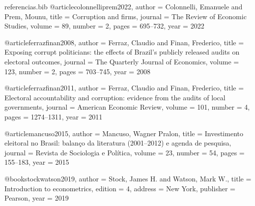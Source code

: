 \begin{filecontents*}[overwrite]{referencias.bib}
@article{colonnelliprem2022,
  author  = {Colonnelli, Emanuele and Prem, Mounu},
  title   = {Corruption and firms},
  journal = {The Review of Economic Studies},
  volume  = {89},
  number  = {2},
  pages   = {695--732},
  year    = {2022}
}

@article{ferrazfinan2008,
  author  = {Ferraz, Claudio and Finan, Frederico},
  title   = {Exposing corrupt politicians: the effects of {B}razil's publicly released audits on electoral outcomes},
  journal = {The Quarterly Journal of Economics},
  volume  = {123},
  number  = {2},
  pages   = {703--745},
  year    = {2008}
}

@article{ferrazfinan2011,
  author  = {Ferraz, Claudio and Finan, Frederico},
  title   = {Electoral accountability and corruption: evidence from the audits of local governments},
  journal = {American Economic Review},
  volume  = {101},
  number  = {4},
  pages   = {1274--1311},
  year    = {2011}
}

@article{mancuso2015,
  author  = {Mancuso, Wagner Pralon},
  title   = {Investimento eleitoral no {B}rasil: balanço da literatura (2001--2012) e agenda de pesquisa},
  journal = {Revista de Sociologia e Política},
  volume  = {23},
  number  = {54},
  pages   = {155--183},
  year    = {2015}
}

@book{stockwatson2019,
  author    = {Stock, James H. and Watson, Mark W.},
  title     = {Introduction to econometrics},
  edition   = {4},
  address   = {New York},
  publisher = {Pearson},
  year      = {2019}
}
\end{filecontents*}

\documentclass[article,12pt,oneside,a4paper,english,brazil]{abntex2}

\usepackage[T1]{fontenc}
\usepackage[utf8]{inputenc}
\usepackage{mathptmx}
\usepackage{indentfirst}
\usepackage{microtype}
\usepackage{graphicx}
\usepackage{booktabs}
\usepackage{amsmath}
\usepackage{xcolor}
\usepackage{float}
\usepackage{placeins}
\usepackage[alf]{abntex2cite}



